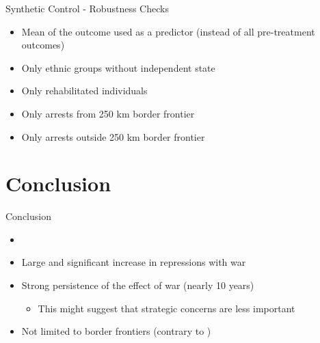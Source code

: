 \documentclass[11pt]{beamer}
\begin{document}
\begin{frame}[label=sc_robustness_checks]{Synthetic Control - Robustness Checks}
 \begin{itemize}
    \item Mean of the outcome used as a predictor (instead of all pre-treatment outcomes) \hyperlink{sc_mean}{}
        \item Only ethnic groups without independent state \hyperlink{sc_without_ind_state}{}
        \item Only rehabilitated individuals \hyperlink{sc_rehabs}{}
        \item Only arrests from 250 km border frontier \hyperlink{sc_border_area}{}
        \item Only arrests outside 250 km border frontier \hyperlink{sc_non_border_area}{}
    \end{itemize}
\end{frame}


\section{Conclusion}

\begin{frame}{Conclusion}
\begin{itemize}
    \item 
    \item Large and significant increase in repressions with war
    \item Strong persistence of the effect of war (nearly 10 years)
    \begin{itemize}
        \item This might suggest that strategic concerns are less important 
    \end{itemize}
    \item Not limited to border frontiers (contrary to \citet{mcnamee_demographic_2019})
\end{itemize}

\end{frame}
\end{document}
